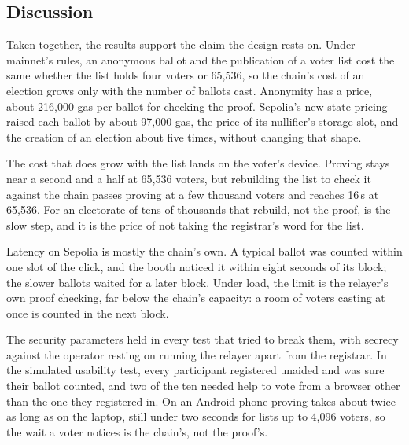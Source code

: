 \subsection{Discussion}

Taken together, the results support the claim the design rests on. Under
mainnet's rules, an anonymous ballot and the publication of a voter list cost
the same whether the list holds four voters or 65,536, so the chain's cost of
an election grows only with the number of ballots cast. Anonymity has a price,
about 216,000 gas per ballot for checking the proof. Sepolia's new state
pricing raised each ballot by about 97,000 gas, the price of its nullifier's
storage slot, and the creation of an election about five times, without
changing that shape.

The cost that does grow with the list lands on the voter's device. Proving
stays near a second and a half at 65,536 voters, but rebuilding the list to
check it against the chain passes proving at a few thousand voters and reaches
16\,s at 65,536. For an electorate of tens of thousands that rebuild, not the
proof, is the slow step, and it is the price of not taking the registrar's word
for the list.

Latency on Sepolia is mostly the chain's own. A typical ballot was counted
within one slot of the click, and the booth noticed it within eight seconds of
its block; the slower ballots waited for a later block. Under load, the limit
is the relayer's own proof checking, far below the chain's capacity: a room of
voters casting at once is counted in the next block.

The security parameters held in every test that tried to break them, with
secrecy against the operator resting on running the relayer apart from the
registrar. In the simulated usability test, every participant registered
unaided and was sure their ballot counted, and two of the ten needed help to
vote from a browser other than the one they registered in. On an Android phone
proving takes about twice as long as on the laptop, still under two seconds
for lists up to 4,096 voters, so the wait a voter notices is the chain's,
not the proof's.
